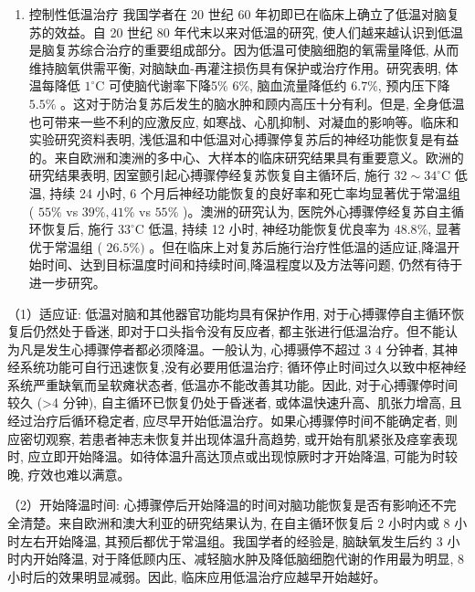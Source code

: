 \documentclass[10pt]{article}
\begin{document}
\begin{enumerate}
  \item 控制性低温治疗 我国学者在 20 世纪 60 年初即已在临床上确立了低温对脑复苏的效益。自 20 世纪 80 年代末以来对低温的研究, 使人们越来越认识到低温是脑复苏综合治疗的重要组成部分。因为低温可使脑细胞的氧需量降低, 从而维持脑氧供需平衡, 对脑缺血-再灌注损伤具有保护或治疗作用。研究表明, 体温每降低 $1^{\circ} \mathrm{C}$ 可使脑代谢率下降5\% 6\%, 脑血流量降低约 $6.7 \%$, 预内压下降 $5.5 \%$ 。这对于防治复苏后发生的脑水肿和顾内高压十分有利。但是, 全身低温也可带来一些不利的应激反应, 如寒战、心肌抑制、对凝血的影响等。临床和实验研究资料表明, 浅低温和中低温对心搏骤停复苏后的神经功能恢复是有益的。来自欧洲和澳洲的多中心、大样本的临床研究结果具有重要意义。欧洲的研究结果表明, 因室颤引起心搏骤停经复苏恢复自主循环后, 施行 $32 \sim 34^{\circ} \mathrm{C}$ 低温, 持续 24 小时, 6 个月后神经功能恢复的良好率和死亡率均显著优于常温组 ( $55 \%$ vs $39 \%, 41 \%$ vs $55 \%$ )。澳洲的研究认为, 医院外心搏骤停经复苏自主循环恢复后, 施行 $33^{\circ} \mathrm{C}$ 低温, 持续 12 小时, 神经功能恢复优良率为 $48.8 \%$, 显著优于常温组 ( $26.5 \%)$ 。但在临床上对复苏后施行治疗性低温的适应证,降温开始时间、达到目标温度时间和持续时间,降温程度以及方法等问题, 仍然有待于进一步研究。
\end{enumerate}

（1）适应证: 低温对脑和其他器官功能均具有保护作用, 对于心搏骤停自主循环恢复后仍然处于昏迷, 即对于口头指令没有反应者, 都主张进行低温治疗。但不能认为凡是发生心搏骤停者都必须降温。一般认为, 心搏䯅停不超过 3 4 分钟者, 其神经系统功能可自行迅速恢复,没有必要用低温治疗; 循环停止时间过久以致中枢神经系统严重缺氧而呈软瘫状态者, 低温亦不能改善其功能。因此, 对于心搏骤停时间较久 (>4 分钟), 自主循环已恢复仍处于昏迷者, 或体温快速升高、肌张力增高, 且经过治疗后循环稳定者, 应尽早开始低温治疗。如果心搏骤停时间不能确定者, 则应密切观察, 若患者神志未恢复并出现体温升高趋势, 或开始有肌紧张及痉挛表现时, 应立即开始降温。如待体温升高达顶点或出现惊厥时才开始降温, 可能为时较晚, 疗效也难以满意。

（2）开始降温时间: 心搏骤停后开始降温的时间对脑功能恢复是否有影响还不完全清楚。来自欧洲和澳大利亚的研究结果认为, 在自主循环恢复后 2 小时内或 8 小时左右开始降温, 其预后都优于常温组。我国学者的经验是, 脑缺氧发生后约 3 小时内开始降温, 对于降低顾内压、减轻脑水肿及降低脑细胞代谢的作用最为明显, 8 小时后的效果明显减弱。因此, 临床应用低温治疗应越早开始越好。
\end{document}
